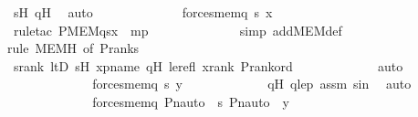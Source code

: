 \begin{isabellebody}
\ sH\ qH\ \isamarkupfalse%
\ auto\isanewline
\ \ \ \ \ \ \ \ \isamarkupfalse%
\ \isamarkupfalse%
\ {\isachardoublequoteopen}{\isachardot}{\kern0pt}{\isachardot}{\kern0pt}{\isachardot}{\kern0pt}\ {\isasymlongleftrightarrow}\ forces{\isacharunderscore}{\kern0pt}mem{\isacharparenleft}{\kern0pt}q{\isacharcomma}{\kern0pt}\ s{\isacharcomma}{\kern0pt}\ x{\isacharparenright}{\kern0pt}{\isachardoublequoteclose}\ \isanewline
\ \ \ \ \ \ \ \ \ \ \isamarkupfalse%
\ {\isacharparenleft}{\kern0pt}rule{\isacharunderscore}{\kern0pt}tac\ P{\isacharequal}{\kern0pt}{\isachardoublequoteopen}MEM{\isacharparenleft}{\kern0pt}q{\isacharcomma}{\kern0pt}s{\isacharcomma}{\kern0pt}x{\isacharparenright}{\kern0pt}{\isachardoublequoteclose}\ \ mp{\isacharparenright}{\kern0pt}\ \isanewline
\ \ \ \ \ \ \ \ \ \ \ \isamarkupfalse%
\ {\isacharparenleft}{\kern0pt}simp\ add{\isacharcolon}{\kern0pt}MEM{\isacharunderscore}{\kern0pt}def{\isacharparenright}{\kern0pt}\ \isanewline
\ \ \ \ \ \ \ \ \ \ \isamarkupfalse%
{\isacharparenleft}{\kern0pt}rule\ MEMH\ {\isacharbrackleft}{\kern0pt}of\ {\isachardoublequoteopen}P{\isacharunderscore}{\kern0pt}rank{\isacharparenleft}{\kern0pt}s{\isacharparenright}{\kern0pt}{\isachardoublequoteclose}{\isacharbrackright}{\kern0pt}{\isacharparenright}{\kern0pt}\ \isanewline
\ \ \ \ \ \ \ \ \ \ \isamarkupfalse%
\ srank\ ltD\ sH\ xpname\ qH\ le{\isacharunderscore}{\kern0pt}refl\ xrank\ P{\isacharunderscore}{\kern0pt}rank{\isacharunderscore}{\kern0pt}ord\ \isanewline
\ \ \ \ \ \ \ \ \ \ \isamarkupfalse%
\ auto\ \ \ \ \ \ \ \ \isanewline
\ \ \ \ \ \ \ \ \isamarkupfalse%
\ \isamarkupfalse%
\ {\isachardoublequoteopen}{\isachardot}{\kern0pt}{\isachardot}{\kern0pt}{\isachardot}{\kern0pt}\ {\isasymlongleftrightarrow}\ forces{\isacharunderscore}{\kern0pt}mem{\isacharparenleft}{\kern0pt}q{\isacharcomma}{\kern0pt}\ s{\isacharcomma}{\kern0pt}\ y{\isacharparenright}{\kern0pt}{\isachardoublequoteclose}\ \isanewline
\ \ \ \ \ \ \ \ \ \ \isamarkupfalse%
\ qH\ qlep\ assm\ sin\ \isamarkupfalse%
\ auto\ \isanewline
\ \ \ \ \ \ \ \ \isamarkupfalse%
\ \isamarkupfalse%
\ {\isachardoublequoteopen}{\isachardot}{\kern0pt}{\isachardot}{\kern0pt}{\isachardot}{\kern0pt}\ {\isasymlongleftrightarrow}\ forces{\isacharunderscore}{\kern0pt}mem{\isacharparenleft}{\kern0pt}{\isasympi}{\isacharbackquote}{\kern0pt}q{\isacharcomma}{\kern0pt}\ Pn{\isacharunderscore}{\kern0pt}auto{\isacharparenleft}{\kern0pt}{\isasympi}{\isacharparenright}{\kern0pt}\ {\isacharbackquote}{\kern0pt}\ s{\isacharcomma}{\kern0pt}\ Pn{\isacharunderscore}{\kern0pt}auto{\isacharparenleft}{\kern0pt}{\isasympi}{\isacharparenright}{\kern0pt}\ {\isacharbackquote}{\kern0pt}\ y{\isacharparenright}{\kern0pt}{\isachardoublequoteclose}\ \isanewline

\end{isabellebody}
